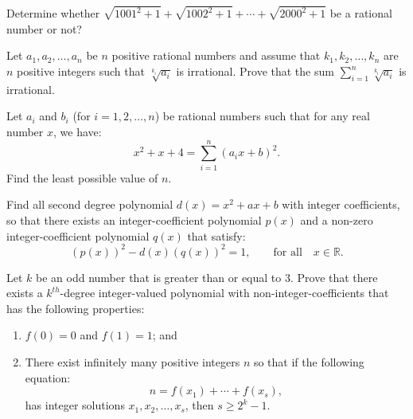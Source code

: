 \begin{question}[name={2005 China TST}]
    Determine whether $\sqrt{1001^2+1}+\sqrt{1002^2+1}+ \cdots + \sqrt{2000^2+1}$ be a rational number or not?
\end{question}


\begin{question}[name={Zhaobin vs Vess}]
    Let $a_1,a_2,\dots,a_n$ be $n$ positive rational numbers and assume that $k_1,k_2,\dots,k_n$ are $n$ positive integers such that $\sqrt[{k_i}]{a_i}$ is irrational. Prove that the sum $\sum_{i=1}^{n} \sqrt[{k_i}]{a_i}$ is irrational.
\end{question}


\begin{question}[name={2006 China TST}]
    Let $a_{i}$ and $b_{i}$ (for $i=1,2, \dots, n$) be rational numbers such that for any real number $x$, we have: \[x^{2}+x+4=\sum_{i=1}^{n}(a_{i}x+b)^{2}.\] Find the least possible value of $n$.
\end{question}




\begin{question}[name={2003 China TST}]
    Find all second degree polynomial $d(x)=x^{2}+ax+b$ with integer coefficients, so that there exists an integer-coefficient polynomial $p(x)$ and a non-zero integer-coefficient polynomial $q(x)$ that satisfy: \[\left( p(x) \right)^{2}-d(x) \left( q(x) \right)^{2}=1, \qquad \text{for all} \quad x \in \mathbb R.\]
\end{question}




\begin{question}[name={2006 China TST}]
    Let $k$ be an odd number that is greater than or equal to $3$. Prove that there exists a $k^{th}$-degree integer-valued polynomial with non-integer-coefficients that has the following properties:
    \begin{enumerate}
        \item $f(0)=0$ and $f(1)=1$; and
        \item There exist infinitely many positive integers $n$ so that if the following equation: \[ n= f(x_1)+\cdots+f(x_s), \] has integer solutions $x_1, x_2, \dots, x_s$, then $s \geq 2^k-1$.
    \end{enumerate} 
\end{question}


